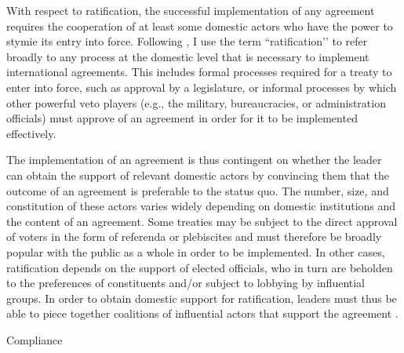 With respect to ratification, the successful implementation of any agreement requires the cooperation of at least some domestic actors who have the power to stymie its entry into force. Following \citet{putnam1988}, I use the term ``ratification’’ to refer broadly to any process at the domestic level that is necessary to implement international agreements. This includes formal processes required for a treaty to enter into force, such as approval by a legislature, or informal processes by which other powerful veto players (e.g., the military, bureaucracies, or administration officials) must approve of an agreement in order for it to be implemented effectively. 















The implementation of an agreement is thus contingent on whether the leader can obtain the support of relevant domestic actors by convincing them that the outcome of an agreement is preferable to the status quo. The number, size, and constitution of these actors varies widely depending on domestic institutions and the content of an agreement. Some treaties may be subject to the direct approval of voters in the form of referenda or plebiscites and must therefore be broadly popular with the public as a whole in order to be implemented. In other cases, ratification depends on the support of elected officials, who in turn are beholden to the preferences of constituents and/or subject to lobbying by influential groups. In order to obtain domestic support for ratification, leaders must thus be able to piece together coalitions of influential actors that support the agreement \citep{fearon1998}.















Compliance















